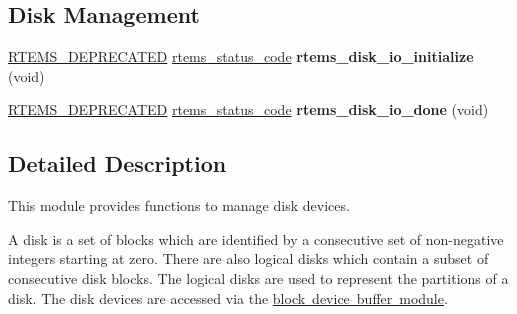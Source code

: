 \subsection*{Disk Management}
\begin{DoxyCompactItemize}
\item 
\mbox{\label{group__rtems__disk_ga86ac6cc2d947eaa09d82cb766dc2460f}} 
\mbox{\hyperlink{group__RTEMSScoreBaseDefs_gab651a076d4d51d50221e7ef7ac99d4e7}{R\+T\+E\+M\+S\+\_\+\+D\+E\+P\+R\+E\+C\+A\+T\+ED}} \mbox{\hyperlink{group__ClassicStatus_ga545d41846817eaba6143d52ee4d9e9fe}{rtems\+\_\+status\+\_\+code}} {\bfseries rtems\+\_\+disk\+\_\+io\+\_\+initialize} (void)
\item 
\mbox{\label{group__rtems__disk_ga6841d5c3b5de242041118285419ffe38}} 
\mbox{\hyperlink{group__RTEMSScoreBaseDefs_gab651a076d4d51d50221e7ef7ac99d4e7}{R\+T\+E\+M\+S\+\_\+\+D\+E\+P\+R\+E\+C\+A\+T\+ED}} \mbox{\hyperlink{group__ClassicStatus_ga545d41846817eaba6143d52ee4d9e9fe}{rtems\+\_\+status\+\_\+code}} {\bfseries rtems\+\_\+disk\+\_\+io\+\_\+done} (void)
\end{DoxyCompactItemize}


\subsection{Detailed Description}
This module provides functions to manage disk devices. 

A disk is a set of blocks which are identified by a consecutive set of non-\/negative integers starting at zero. There are also logical disks which contain a subset of consecutive disk blocks. The logical disks are used to represent the partitions of a disk. The disk devices are accessed via the \mbox{\hyperlink{group__rtems__bdbuf}{block device buffer module}}. 